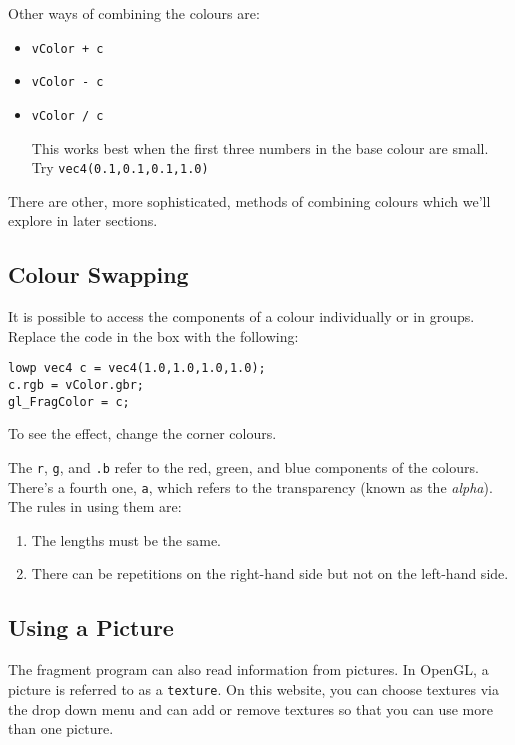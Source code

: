 \documentclass[
  html5,%
  mathml,%
  use filename%
]{internet}
\begin{document}
Other ways of combining the colours are:
%
\begin{itemize}
\item \verb!vColor + c!
\item \verb!vColor - c!
\item \verb!vColor / c!

This works best when the first three numbers in the base colour are small.
Try \verb!vec4(0.1,0.1,0.1,1.0)!
\end{itemize}

There are other, more sophisticated, methods of combining colours which we'll explore in later sections.

\subsection{Colour Swapping}

It is possible to access the components of a colour individually or in groups.
Replace the code in the box with the following:

\begin{tcolorbox}
\begin{verbatim}
lowp vec4 c = vec4(1.0,1.0,1.0,1.0);
c.rgb = vColor.gbr;
gl_FragColor = c;
\end{verbatim}
\end{tcolorbox}

To see the effect, change the corner colours.

The \verb+r+, \verb+g+, and \verb+.b+ refer to the red, green, and blue components of the colours.
There's a fourth one, \verb+a+, which refers to the transparency (known as the \emph{alpha}).
The rules in using them are:
%
\begin{enumerate}
\item The lengths must be the same.
\item There can be repetitions on the right-hand side but not on the left-hand side.
\end{enumerate}

\subsection{Using a Picture}

The fragment program can also read information from pictures.
In OpenGL, a picture is referred to as a \verb+texture+.
On this website, you can choose textures via the drop down menu and can add or remove textures so that you can use more than one picture.
\end{document}
